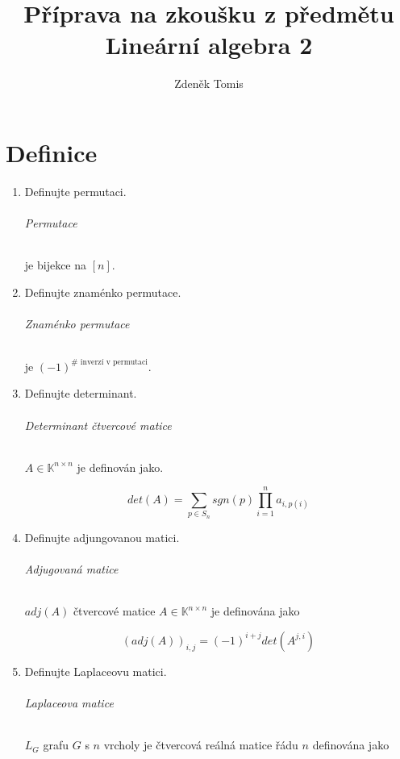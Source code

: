\documentclass[10pt,a4paper]{article}
\title{Příprava na zkoušku z předmětu Lineární algebra 2}
\author{Zdeněk Tomis}
\date{}
\theoremstyle{plain}
\begin{document}
\maketitle

\part{Definice}

\begin{enumerate}

\item Definujte permutaci.

\paragraph{Permutace} je bijekce na $[n]$.

\item Definujte znaménko permutace.

\paragraph{Znaménko permutace} je $(-1)^{\# \text{ inverzí v permutaci}}$.

\item Definujte determinant.

\paragraph{Determinant čtvercové matice} $A \in \mathbb{K}^{n \times n}$ je definován jako.

\[ det(A) = \sum_{p \in S_n} sgn(p) \prod^n_{i = 1} a_{i, p(i)} \]

\item Definujte adjungovanou matici.

\paragraph{Adjugovaná matice} $adj(A)$ čtvercové matice  $A \in \mathbb{K}^{n \times n}$ je definována jako

\[ (adj(A))_{i,j} = (-1)^{i+j} det(A^{j,i})\]
\item Definujte Laplaceovu matici.

\paragraph{Laplaceova matice} $L_G$ grafu $G$ s $n$ vrcholy je čtvercová reálná matice řádu $n$ definována jako


\end{enumerate}
\end{document}
